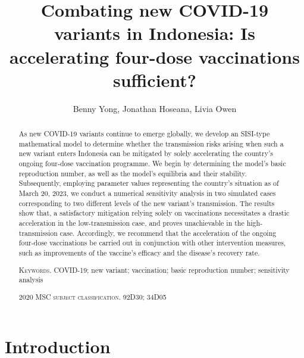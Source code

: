 \documentclass[11pt,reqno]{amsart}
\begin{document}
\title{Combating new COVID-19 variants in Indonesia: Is accelerating four-dose vaccinations sufficient?}

\author{\small Benny Yong, Jonathan Hoseana, Livia Owen}
\address{\normalfont\small Center for Mathematics and Society, Department of Mathematics, Parahyangan Catholic University, Bandung 40141, Indonesia}
\date{}

\begin{abstract}
As new COVID-19 variants continue to emerge globally, we develop an SISI-type mathematical model to determine whether the transmission risks arising when such a new variant enters Indonesia can be mitigated by solely accelerating the country's ongoing four-dose vaccination programme. We begin by determining the model's basic reproduction number, as well as the model's equilibria and their stability. Subsequently, employing parameter values representing the country's situation as of March 20, 2023, we conduct a numerical sensitivity analysis in two simulated cases corresponding to two different levels of the new variant's transmission. The results show that, a satisfactory mitigation relying solely on vaccinations necessitates a drastic acceleration in the low-transmission case, and proves unachievable in the high-transmission case. Accordingly, we recommend that the acceleration of the ongoing four-dose vaccinations be carried out in conjunction with other intervention measures, such as improvements of the vaccine's efficacy and the disease's recovery rate.

\smallskip\noindent
\textsc{Keywords.} COVID-19; new variant; vaccination; basic reproduction number; sensitivity analysis

\smallskip\noindent\textsc{2020 MSC subject classification.} 92D30; 34D05
\end{abstract}

\maketitle

\section{Introduction}\label{section:Introduction}
\end{document}
